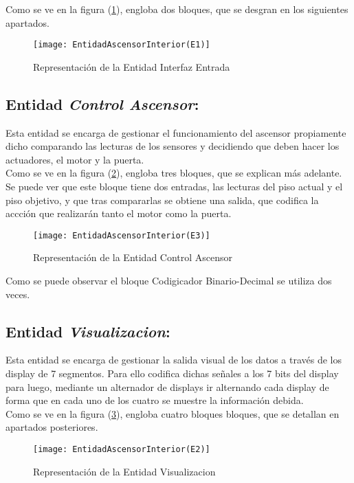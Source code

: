 	Como se ve en la figura (\ref{fig:EntidadesAscensorE1}), engloba dos bloques, que se desgran en los siguientes apartados.
	\begin{figure}[H]
		    \centering
		    \texttt{[image: EntidadAscensorInterior(E1)]}
		    \caption{Representación de la Entidad Interfaz Entrada}
		    \label{fig:EntidadesAscensorE1}
	\end{figure}

\subsection{Entidad \textit{Control Ascensor}:} \label{bloque:ControlAscensor}
	Esta entidad se encarga de gestionar el funcionamiento del ascensor propiamente dicho comparando las lecturas de los sensores y decidiendo que deben hacer los actuadores, el motor y la puerta.  \\ 

	Como se ve en la figura (\ref{fig:EntidadesAscensorE3}), engloba tres bloques, que se explican más adelante. Se puede ver que este bloque tiene dos entradas, las lecturas del piso actual y el piso objetivo, y que tras compararlas se obtiene una salida, que codifica la accción que realizarán tanto el motor como la puerta.
	\begin{figure}[H]
		    \centering
		    \texttt{[image: EntidadAscensorInterior(E3)]}
		    \caption{Representación de la Entidad Control Ascensor}
		    \label{fig:EntidadesAscensorE3}
	\end{figure}

	Como se puede observar el bloque Codigicador Binario-Decimal se utiliza dos veces. \\ 

\subsection{Entidad \textit{Visualizacion}:} \label{bloque:Visualizacion}	
	Esta entidad se encarga de gestionar la salida visual de los datos a través de los display de 7 segmentos. Para ello codifica dichas señales a los 7 bits del display para luego, mediante un alternador de displays ir alternando cada display de forma que en cada uno de los cuatro se muestre la información debida.  \\ 

	Como se ve en la figura (\ref{fig:EntidadesAscensorE2}), engloba cuatro bloques bloques, que se detallan en apartados posteriores.
	\begin{figure}[H]
		    \centering
		    \texttt{[image: EntidadAscensorInterior(E2)]}
		    \caption{Representación de la Entidad Visualizacion}
		    \label{fig:EntidadesAscensorE2}
	\end{figure}

